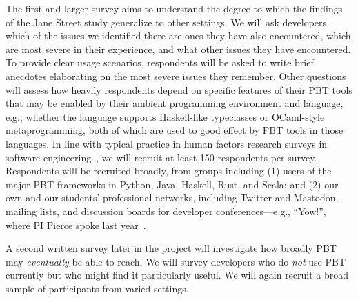 The first and larger survey
aims to understand the degree to which
the findings of the Jane Street study generalize to other settings.
We will
ask developers which of the issues we identified there are
ones they have also encountered, which are most severe
in their experience, and what
other issues they have encountered.
To provide
clear usage scenarios, respondents will
be asked to write brief anecdotes elaborating on the
most severe issues they remember.  Other questions will assess how
heavily respondents depend on specific features of their PBT tools
that may be enabled by their
ambient programming environment and language, e.g., whether the
language supports Haskell-like typeclasses or OCaml-style
metaprogramming, both of which are used to good effect by
PBT tools in those languages.
\iflater{}\fi{} In line with typical practice in
human factors research surveys in software
engineering~\cite{ref:robillard2009makes,ref:uddin2015api,ref:murphyhill2019predicts},
we will recruit at least 150 respondents per survey.
Respondents will
be recruited broadly, from groups including
(1)
users of the major PBT frameworks in Python, Java, Haskell, Rust, and
Scala; and
(2) our own and our students' professional networks, including
Twitter and Mastodon, mailing lists, and discussion boards for developer
conferences---e.g., ``Yow!'', where PI Pierce spoke last
year~\cite{Pierce:Yow22}.

A second written survey later in the project will investigate
how broadly PBT may {\em eventually} be able to reach.  We will
survey developers who do {\em not} use PBT
currently but who might find it particularly useful.
We will again recruit a broad sample of participants from varied settings.


%


